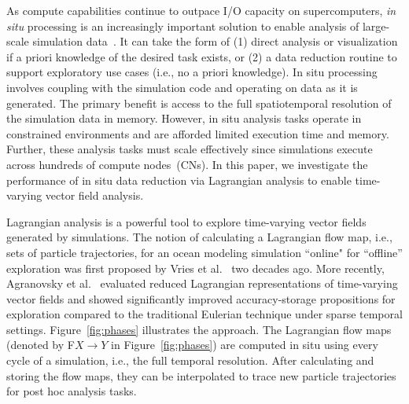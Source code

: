 As compute capabilities continue to outpace I/O capacity on supercomputers, \textit{in situ} processing is an increasingly important solution to enable analysis of large-scale simulation data~\cite{bauer2016situ}.
%
It can take the form of (1) direct analysis or visualization if a priori knowledge of the desired task exists, or (2) a data reduction routine to support exploratory use cases (i.e., no a priori knowledge). 
%
In situ processing involves coupling with the simulation code and operating on data as it is generated. 
%
The primary benefit is access to the full spatiotemporal resolution of the simulation data in memory.
%
However, in situ analysis tasks operate in constrained environments and are afforded limited execution time and memory.
%
Further, these analysis tasks must scale effectively since simulations execute across hundreds of compute nodes~(CNs).
%
%
In this paper, we investigate the performance of in situ data reduction via Lagrangian analysis to enable time-varying vector field analysis.
%

Lagrangian analysis is a powerful tool to explore time-varying vector fields generated by simulations.
%
The notion of calculating a Lagrangian flow map, i.e., sets of particle trajectories, for an ocean modeling simulation ``online" for ``offline'' exploration was first proposed by Vries et al.~\cite{vries2001calculating} two decades ago.
%
More recently, Agranovsky et al.~\cite{agranovsky2014improved} evaluated reduced Lagrangian representations of time-varying vector fields and showed significantly improved accuracy-storage propositions for exploration compared to the traditional Eulerian technique under sparse temporal settings. 
%
Figure~\ref{fig:phases} illustrates the approach.
%
The Lagrangian flow maps (denoted by F$X$$\rightarrow$$Y$ in Figure~\ref{fig:phases}) are computed in situ using every cycle of a simulation, i.e., the full temporal resolution.
%
After calculating and storing the flow maps, they can be interpolated to trace new particle trajectories for post hoc analysis tasks.
%
%




